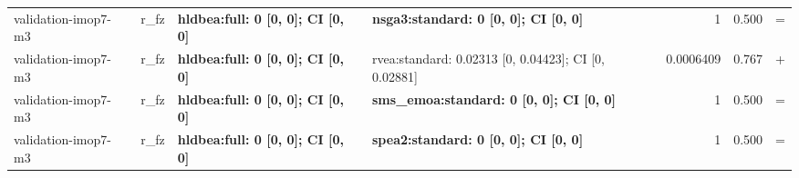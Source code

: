 \begin{tabular}{llllrrc}
validation-imop7-m3 & r\_fz & \textbf{hldbea:full: 0 [0, 0]; CI [0, 0]} & \textbf{nsga3:standard: 0 [0, 0]; CI [0, 0]} & 1 & 0.500 & = \\
validation-imop7-m3 & r\_fz & \textbf{hldbea:full: 0 [0, 0]; CI [0, 0]} & rvea:standard: 0.02313 [0, 0.04423]; CI [0, 0.02881] & 0.0006409 & 0.767 & + \\
validation-imop7-m3 & r\_fz & \textbf{hldbea:full: 0 [0, 0]; CI [0, 0]} & \textbf{sms\_emoa:standard: 0 [0, 0]; CI [0, 0]} & 1 & 0.500 & = \\
validation-imop7-m3 & r\_fz & \textbf{hldbea:full: 0 [0, 0]; CI [0, 0]} & \textbf{spea2:standard: 0 [0, 0]; CI [0, 0]} & 1 & 0.500 & = \\
\bottomrule
\end{tabular}
